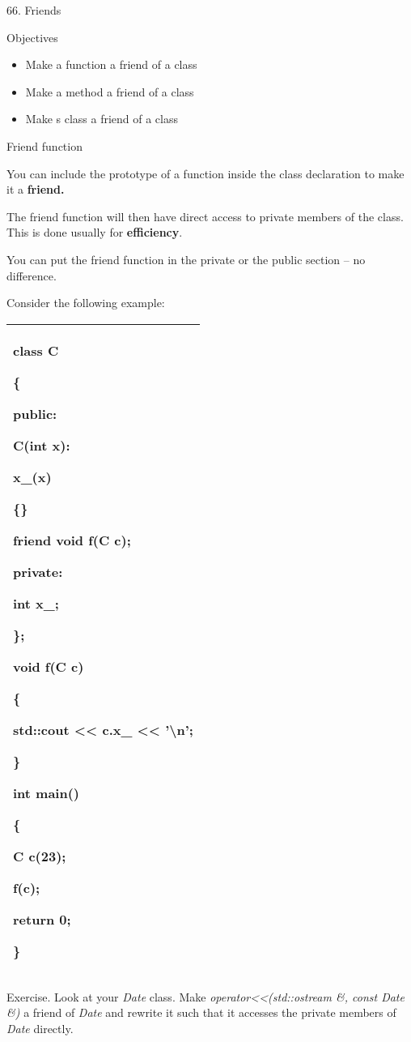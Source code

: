 \documentclass[
]{article}
\author{}
\date{}
\providecommand{\tightlist}{%
  \setlength{\itemsep}{0pt}\setlength{\parskip}{0pt}}
\begin{document}
66. Friends

Objectives

\begin{itemize}
\tightlist
\item
  Make a function a friend of a class
\item
  Make a method a friend of a class
\item
  Make s class a friend of a class
\end{itemize}

Friend function

You can include the prototype of a function inside the class declaration
to make it a \textbf{friend. }

The friend function will then have direct access to private members of
the class. This is done usually for \textbf{efficiency}.

You can put the friend function in the private or the public section --
no difference.

Consider the following example:

\begin{longtable}[]{@{}l@{}}
\toprule
\endhead
\begin{minipage}[t]{0.97\columnwidth}\raggedright
class C

\{

public:

C(int x):

x\_(x)

\{\}

\textbf{friend} void f(C c);

private:

int x\_;

\};

void f(C c)

\{

std::cout \textless\textless{} \textbf{c.x\_} \textless\textless{}
'\textbackslash n';

\}

int main()

\{

C c(23);

f(c);

return 0;

\}\strut
\end{minipage}\tabularnewline
\bottomrule
\end{longtable}

Exercise. Look at your \emph{Date} class. Make
\emph{operator\textless\textless(std::ostream \&, const Date \&)} a
friend of \emph{Date} and rewrite it such that it accesses the private
members of \emph{Date} directly.
\end{document}
